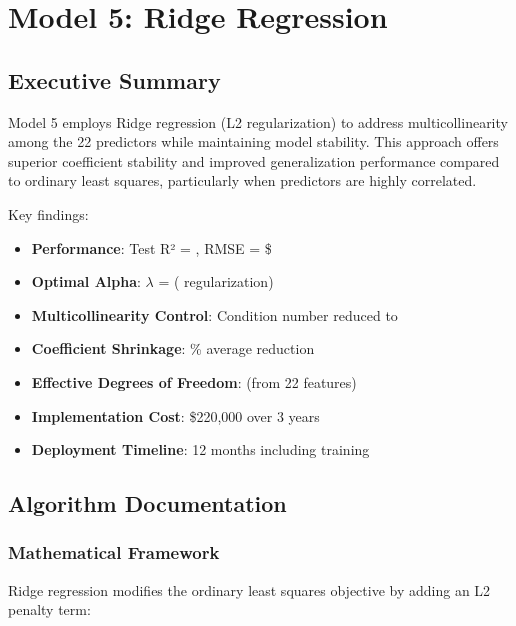 \chapter{Model 5: Ridge Regression}\label{ch:model5}



\section{Executive Summary}

Model 5 employs Ridge regression (L2 regularization) to address multicollinearity among the 22 predictors while maintaining model stability. This approach offers superior coefficient stability and improved generalization performance compared to ordinary least squares, particularly when predictors are highly correlated.

Key findings:
\begin{itemize}
    \item \textbf{Performance}: Test R² = \ModelFiveRSquaredTest{}, RMSE = \$\ModelFiveRMSETest{}
    \item \textbf{Optimal Alpha}: $\lambda$ = \ModelFiveAlpha{} (\ModelFiveRegularizationStrength{} regularization)
    \item \textbf{Multicollinearity Control}: Condition number reduced to \ModelFiveConditionNumber{}
    \item \textbf{Coefficient Shrinkage}: \ModelFiveShrinkageFactor{}\% average reduction
    \item \textbf{Effective Degrees of Freedom}: \ModelFiveEffectiveDf{} (from 22 features)
    \item \textbf{Implementation Cost}: \$220,000 over 3 years
    \item \textbf{Deployment Timeline}: 12 months including training
\end{itemize}

\section{Algorithm Documentation}

\subsection{Mathematical Framework}

Ridge regression modifies the ordinary least squares objective by adding an L2 penalty term:

